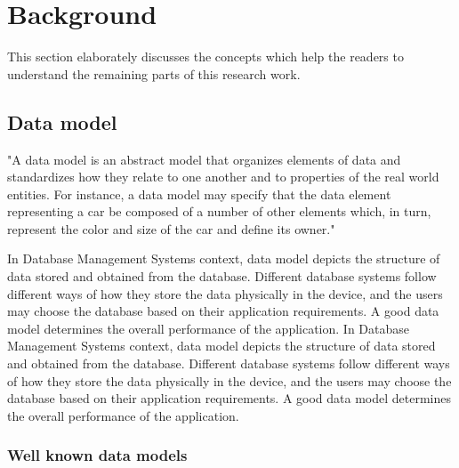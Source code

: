 

	\let\cleardoublepage\clearpage
    \chapter{Background}
    This section elaborately discusses the concepts which help the readers to understand the remaining parts of this research work.
    
    \section{Data model}
    
    "A data model is an abstract model that organizes elements of data and standardizes how they relate to one another and to properties of the real world entities. For instance, a data model may specify that the data element representing a car be composed of a number of other elements which, in turn, represent the color and size of the car and define its owner." \cite{misc08}
    
    In Database Management Systems context, data model depicts the structure of data stored and obtained from the database. Different database systems follow different ways of how they store the data physically in the device, and the users may choose the database based on their application requirements. A good data model determines the overall performance of the application. In Database Management Systems context, data model depicts the structure of data stored and obtained from the database. Different database systems follow different ways of how they store the data physically in the device, and the users may choose the database based on their application requirements. A good data model determines the overall performance of the application. 
    
    \subsection{Well known data models}
    

